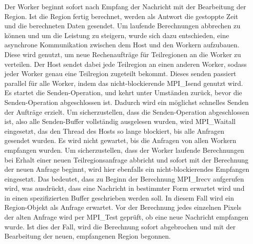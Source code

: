 Der Worker beginnt sofort nach Empfang der Nachricht mit der Bearbeitung der Region. Ist die Region
fertig berechnet, werden als Antwort die gestoppte Zeit und die berechneten Daten gesendet.
Um laufende Berechnungen abbrechen zu können und um die Leistung zu steigern, wurde sich dazu
entschieden, eine asynchrone Kommunikation zwischen dem Host und den Workern aufzubauen. Diese
wird genutzt, um neue Rechenaufträge für Teilregionen an die Worker zu verteilen.
Der Host sendet dabei jede Teilregion an einen anderen Worker, sodass jeder Worker genau eine
Teilregion zugeteilt bekommt. Dieses senden passiert parallel für alle Worker, indem das
nicht-blockierende MPI\_Isend genutzt wird. Es startet die Senden-Operation, und kehrt unter Umständen
zurück, bevor die Senden-Operation abgeschlossen ist. Dadurch wird ein möglichst schnelles Senden der
Aufträge erzielt. Um sicherzustellen, dass die Senden-Operation abgeschlossen ist, also alle
Senden-Buffer vollständig ausgelesen wurden, wird MPI\_Waitall eingesetzt, das den Thread des Hosts so
lange blockiert, bis alle Anfragen gesendet wurden. Es wird nicht gewartet, bis die Anfragen von allen
Workern empfangen wurden.
Um sicherzustellen, dass der Worker laufende Berechnungen bei Erhalt einer neuen Teilregionsanfrage
abbricht und sofort mit der Berechnung der neuen Anfrage beginnt, wird hier ebenfalls ein
nicht-blockierendes Empfangen eingesetzt. Das bedeutet, dass zu Beginn der Berechnung MPI\_Irecv
aufgerufen wird, was ausdrückt, dass eine Nachricht in bestimmter Form erwartet wird und in einen
spezifizierten Buffer geschrieben werden soll. In diesem Fall wird ein Region-Objekt als Anfrage erwartet.
Vor der Berechnung jedes einzelnen Pixels der alten Anfrage wird per MPI\_Test geprüft, ob eine neue
Nachricht empfangen wurde. Ist dies der Fall, wird die Berechnung sofort abgebrochen und mit der
Bearbeitung der neuen, empfangenen Region begonnen.


